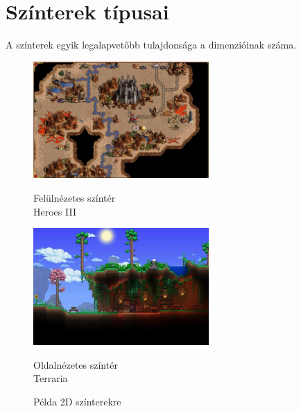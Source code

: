 \chapter{Színterek típusai}
A színterek egyik legalapvetőbb tulajdonsága a dimenzióinak száma. 
\begin{figure}
\centering
\begin{minipage}{.5\textwidth}
  \centering
  \includegraphics[width=190pt]{images/2d-szinter-HeroesIII.jpg}
  \caption{Felülnézetes színtér\\Heroes III}
  \label{fig:test1}
\end{minipage}%
\begin{minipage}{.5\textwidth}
  \centering
  \includegraphics[width=190pt]{images/2d-szinter-Terraria.jpg}
  \caption{Oldalnézetes színtér\\Terraria}
  \label{fig:test2}
\end{minipage}
\caption*{Példa 2D színterekre}
\end{figure}